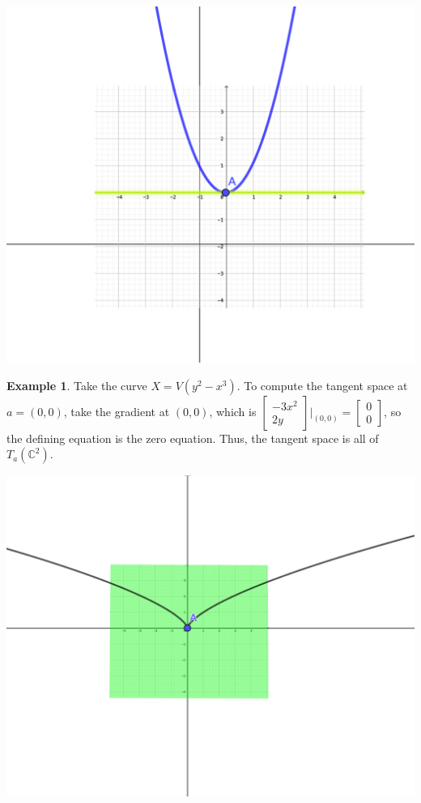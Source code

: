 \documentclass{amsart}[12pt]
\newcommand{\C}{\mathbb{C}}
\numberwithin{equation}{section}
\theoremstyle{plain} %
\theoremstyle{definition}
\newtheorem{ex}[equation]{Example}
\theoremstyle{remark}
\begin{document}
\begin{center}
\includegraphics[scale=.4]{tang2}
\end{center}

\begin{ex}
Take the curve $X=V(y^2 - x^3)$. To compute the tangent space at $a=(0,0)$, take the gradient at $(0,0)$, which is $\begin{bmatrix} -3x^2 \\ 2y \end{bmatrix} |_{(0,0)} =\begin{bmatrix} 0 \\ 0  \end{bmatrix}$, so the defining equation is the zero equation. Thus, the tangent space is all of $T_{a}(\C^2)$.
\end{ex}

\begin{center}
\includegraphics[scale=.4]{tang3}
\end{center}
\end{document}
